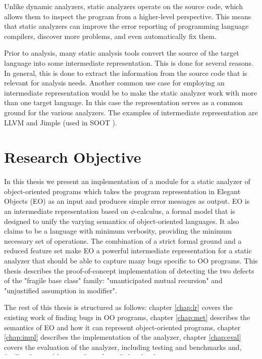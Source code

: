 Unlike dynamic analyzers, static analyzers operate on the source code, which allows them to inspect the program from a higher-level perspective. This means that static analyzers can improve the error reporting of programming language compilers, discover more problems, and  even automatically fix them.

Prior to analysis, many static analysis tools convert the source of the target language into some intermediate representation. This is done for several reasons. In general, this is done to extract the information from the source code that is relevant for analysis needs. Another common use case for employing an intermediate representation would be to
make the static analyzer work with more than one target language. In this case the representation serves as a common ground for the various analyzers. The examples of  intermediate representation are LLVM \cite{llvm} and Jimple \cite{vallee1998jimple} (used in SOOT \cite{vallee2010soot}).

\section{Research Objective}

In this thesis we present an implementation of a module for a static analyzer of object-oriented programs which takes the program representation in Elegant Objects (EO) \cite{eolang} as an input and produces simple error messages as output. EO is an intermediate representation based on $\phi$-calculus, a formal model that is designed to unify the varying semantics of object-oriented languages. It also claims to be a language with minimum verbosity, providing the minimum necessary set of operations. The combination of a strict formal ground and a reduced feature set make EO a powerful intermediate representation for a static analyzer that should be able to capture many bugs specific to OO programs. This thesis describes the proof-of-concept implementation of detecting the two defects of the "fragile base class" \cite{fragilebaseclass} family: "unanticipated mutual recursion" and "unjustified assumption in modifier".

The rest of this thesis is structured as follows: chapter \ref{chap:lr} covers the existing work of finding bugs in OO programs, chapter \ref{chap:met} describes the semantics of EO and how it can represent object-oriented programs, chapter \ref{chap:impl} describes the implementation of the analyzer, chapter \ref{chap:eval} covers the evaluation of the analyzer, including testing and benchmarks and, finally, chapter \ref{chap:conclusion} concludes the thesis.
